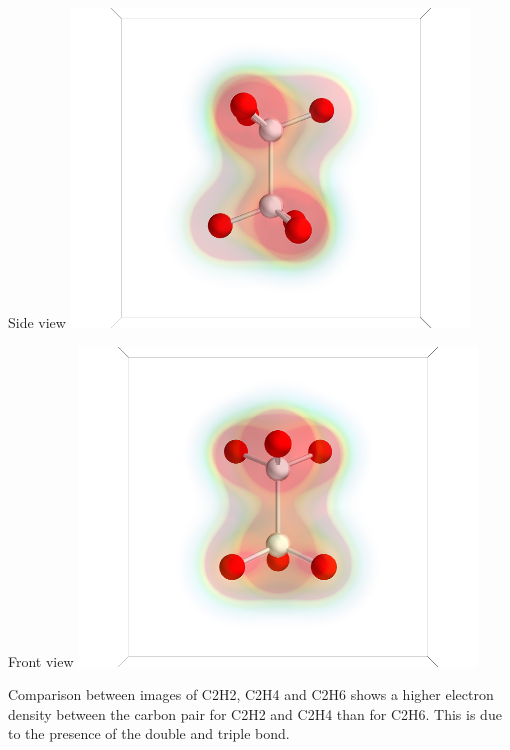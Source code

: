 \documentclass[11pt]{article}
\begin{document}
\begin{itemize}
Side view
\includegraphics[width=.9\linewidth]{./images/C2H6_side.png}

Front view
\includegraphics[width=.9\linewidth]{./images/C2H6_front.png}

Comparison between images of C2H2, C2H4 and C2H6 shows a higher electron density between the carbon pair for C2H2 and C2H4 than for C2H6.  This is due to the presence of the double and triple bond.



\end{itemize}
\end{document}
